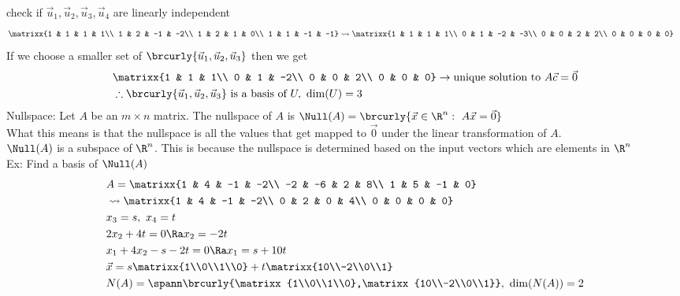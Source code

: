 check if $\vec{u}_1,\vec{u}_2,\vec{u}_3,\vec{u}_4$ are linearly independent
\begin{align*}
    &\matrixx{1 & 1 & 1 & 1\\ 1 & 2 & -1 & -2\\ 1 & 2 & 1 & 0\\ 1 & 1 & -1 & -1}\leadsto\matrixx{1 & 1 & 1 & 1\\ 0 & 1 & -2 & -3\\ 0 & 0 & 2 & 2\\ 0 & 0 & 0 & 0}
\end{align*}
If we choose a smaller set of $\brcurly{\vec{u}_1,\vec{u}_2,\vec{u}_3}$ then we get
\begin{align*}
    &\matrixx{1 & 1 & 1\\ 0 & 1 & -2\\ 0 & 0 & 2\\ 0 & 0 & 0}\to \text{unique solution to }A\vec{c}=\vec{0}\\
    &\therefore \brcurly{\vec{u}_1,\vec{u}_2,\vec{u}_3}\text{ is a basis of }U,\ \dim(U)=3
\end{align*}
Nullspace:
Let $A$ be an $m\times n$ matrix. The nullspace of $A$ is $\Null(A)=\brcurly{\vec{x}\in\R^n:\ A\vec{x}=\vec{0}}$\\
What this means is that the nullspace is all the values that get mapped to $\vec{0}$ under the linear transformation of $A$.\\
$\Null(A)$ is a subspace of $\R^n$. This is because the nullspace is determined based on the input vectors which are elements in $\R^n$\\
Ex: Find a basis of $\Null(A)$
\begin{align*}
    &A=\matrixx{1 & 4 & -1 & -2\\ -2 & -6 & 2 & 8\\ 1 & 5 & -1 & 0}\\
    &\leadsto \matrixx{1 & 4 & -1 & -2\\ 0 & 2 & 0 & 4\\ 0 & 0 & 0 & 0}\\
    &x_3=s,\ x_4=t\\
    &2x_2+4t=0\Ra x_2=-2t\\
    &x_1+4x_2-s-2t=0\Ra x_1=s+10t\\
    &\vec{x}=s\matrixx{1\\0\\1\\0}+t\matrixx{10\\-2\\0\\1}\\
    &N(A)=\spann\brcurly{\matrixx{1\\0\\1\\0},\matrixx{10\\-2\\0\\1}},\ \dim(N(A))=2
\end{align*}
